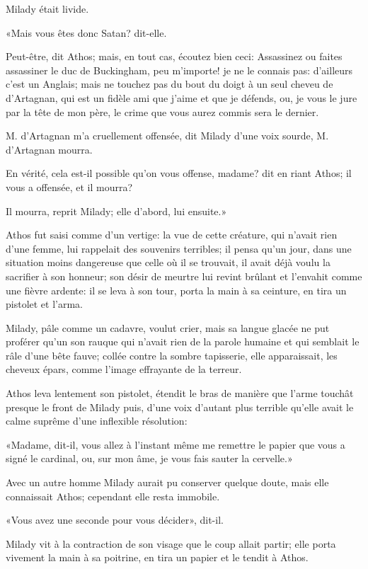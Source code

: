 Milady était livide. 

«Mais vous êtes donc Satan? dit-elle. 

\speak  Peut-être, dit Athos; mais, en tout cas, écoutez bien ceci: Assassinez ou faites assassiner le duc de Buckingham, peu m'importe! je ne le connais pas: d'ailleurs c'est un Anglais; mais ne touchez pas du bout du doigt à un seul cheveu de d'Artagnan, qui est un fidèle ami que j'aime et que je défends, ou, je vous le jure par la tête de mon père, le crime que vous aurez commis sera le dernier. 

\speak  M. d'Artagnan m'a cruellement offensée, dit Milady d'une voix sourde, M. d'Artagnan mourra. 

\speak  En vérité, cela est-il possible qu'on vous offense, madame? dit en riant Athos; il vous a offensée, et il mourra? 

\speak  Il mourra, reprit Milady; elle d'abord, lui ensuite.» 

Athos fut saisi comme d'un vertige: la vue de cette créature, qui n'avait rien d'une femme, lui rappelait des souvenirs terribles; il pensa qu'un jour, dans une situation moins dangereuse que celle où il se trouvait, il avait déjà voulu la sacrifier à son honneur; son désir de meurtre lui revint brûlant et l'envahit comme une fièvre ardente: il se leva à son tour, porta la main à sa ceinture, en tira un pistolet et l'arma. 

Milady, pâle comme un cadavre, voulut crier, mais sa langue glacée ne put proférer qu'un son rauque qui n'avait rien de la parole humaine et qui semblait le râle d'une bête fauve; collée contre la sombre tapisserie, elle apparaissait, les cheveux épars, comme l'image effrayante de la terreur. 

Athos leva lentement son pistolet, étendit le bras de manière que l'arme touchât presque le front de Milady puis, d'une voix d'autant plus terrible qu'elle avait le calme suprême d'une inflexible résolution: 

«Madame, dit-il, vous allez à l'instant même me remettre le papier que vous a signé le cardinal, ou, sur mon âme, je vous fais sauter la cervelle.» 

Avec un autre homme Milady aurait pu conserver quelque doute, mais elle connaissait Athos; cependant elle resta immobile. 

«Vous avez une seconde pour vous décider», dit-il. 

Milady vit à la contraction de son visage que le coup allait partir; elle porta vivement la main à sa poitrine, en tira un papier et le tendit à Athos. 

